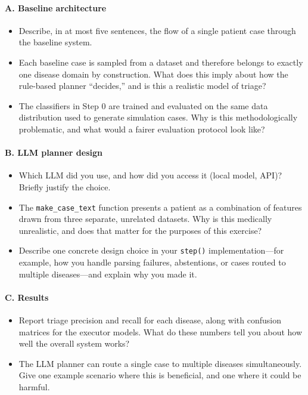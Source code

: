 \paragraph{A. Baseline architecture}
\begin{itemize}
    \item Describe, in at most five sentences, the flow of a single patient case through the baseline system.
    \item Each baseline case is sampled from a dataset and therefore belongs to exactly one disease domain by construction. What does this imply about how the rule-based planner ``decides,'' and is this a realistic model of triage?
    \item The classifiers in Step 0 are trained and evaluated on the same data distribution used to generate simulation cases. Why is this methodologically problematic, and what would a fairer evaluation protocol look like?
\end{itemize}

\paragraph{B. LLM planner design}
\begin{itemize}
    \item Which LLM did you use, and how did you access it (local model, API)? Briefly justify the choice.
    \item The \texttt{make\_case\_text} function presents a patient as a combination of features drawn from three separate, unrelated datasets. Why is this medically unrealistic, and does that matter for the purposes of this exercise?
    \item Describe one concrete design choice in your \texttt{step()} implementation---for example, how you handle parsing failures, abstentions, or cases routed to multiple diseases---and explain why you made it.
\end{itemize}

\paragraph{C. Results}
\begin{itemize}
    \item Report triage precision and recall for each disease, along with confusion matrices for the executor models. What do these numbers tell you about how well the overall system works?
    \item The LLM planner can route a single case to multiple diseases simultaneously. Give one example scenario where this is beneficial, and one where it could be harmful.
\end{itemize}

